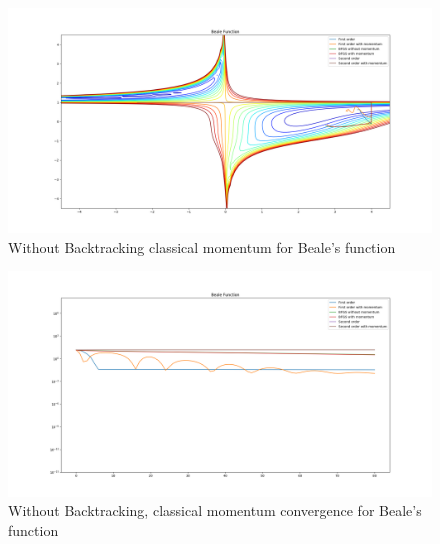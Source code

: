 \documentclass{article}
\begin{document}
\begin{center}
\begin{figure}[H]
	\includegraphics[width=\linewidth]{../Images/bealemomentum.png}
	\caption{Without Backtracking classical momentum for Beale's function}
	\label{fig:Without Backtracking classical momentum for Beale's function}
\end{figure}

\begin{figure}[H]
	\includegraphics[width=\linewidth]{../Images/bealemomentum1.png}
	\caption{Without Backtracking, classical momentum convergence for Beale's function}
	\label{fig:Without Backtracking, classical momentum convergence for Beale's function}
\end{figure}


\end{center}
\end{document}
